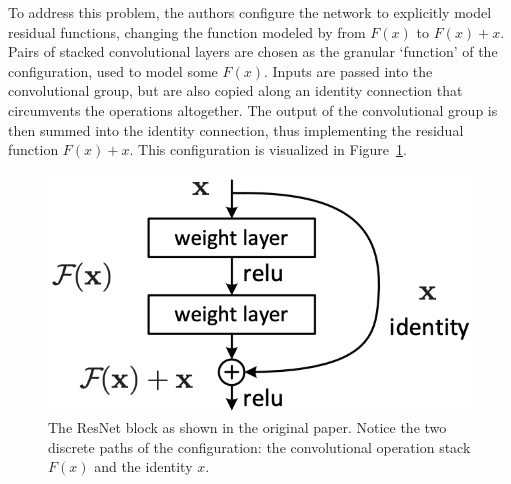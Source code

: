 To address this problem, the authors configure the network to explicitly model residual functions, changing the function
modeled by from $F(x)$ to $F(x) + x$. Pairs of stacked convolutional layers are chosen as the granular `function' of the
configuration, used to model some $F(x)$. Inputs are passed into the convolutional group, but are also copied along an
identity connection that circumvents the operations altogether. The output of the convolutional group is then summed into
the identity connection, thus implementing the residual function $F(x) + x$. This configuration is visualized in Figure~\ref{fig:resnet}.

\begin{figure}
    \center
    \includegraphics[width=.5\linewidth]{resnet_cell}
    \caption[The ResNet block]{The ResNet block as shown in the original paper. Notice the two discrete paths of the configuration: the
    convolutional operation stack $F(x)$ and the identity $x$.}
    \label{fig:resnet}
\end{figure}

